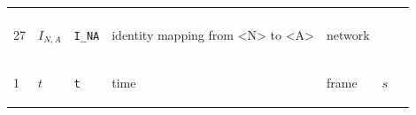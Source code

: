 \begin{longtable}{|p{1cm}|p{2.5cm}|p{4.5cm}|p{8cm}|p{3.0cm}|p{3cm}|p{1cm}|}
             & \\
            27
             & \hypertarget{"v:27"}{ $ {{I}}{_{N, A}} $}
             & \verb|I_NA|
             & identity mapping from <N> to <A>
             & \begin{lay}network \end{lay}
             & $  $
             & \\
            1
             & \hypertarget{"v:1"}{ $ {t}{_{}} $}
             & \verb|t|
             & time
             & \begin{lay}frame \end{lay}
             & $ s \, $
             & \\
    \end{longtable}
